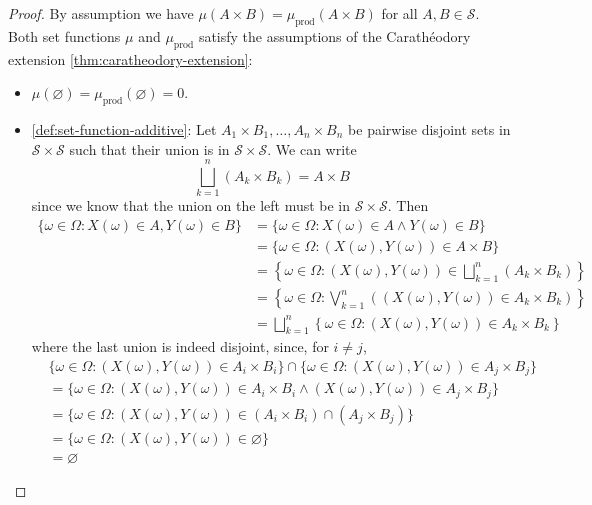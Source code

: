 \begin{proof}
By assumption we have $\mu(A \times B) = \mu_{\text{prod}}(A \times B)$ for all $A, B \in \mathcal{S}$.
Both set functions $\mu$ and $\mu_{\text{prod}}$ satisfy the assumptions of the Carathéodory extension \autoref{thm:caratheodory-extension}:
\begin{itemize}
  \item 
  $\mu(\varnothing)=\mu_{\text{prod}}(\varnothing)=0$. \cmark %
  \item 
  \ref{def:set-function-additive}:
  Let $A_1 \times B_1, \ldots, A_n \times B_n$ be pairwise disjoint sets in $\mathcal{S} \times \mathcal{S}$ such that their union is in $\mathcal{S} \times \mathcal{S}$.
  We can write
  \[
    \bigsqcup_{k = 1}^n (A_k \times B_k)
    = 
    A \times B 
  \]
  since we know that the union on the left must be in $\mathcal{S} \times \mathcal{S}$.
  Then
\begingroup
\allowdisplaybreaks
\begin{align*}
\{\omega \in \Omega : X(\omega) \in A, Y(\omega) \in B\} 
&=
\{\omega \in \Omega : X(\omega) \in A \wedge Y(\omega) \in B\} \\
&=
\{\omega \in \Omega : (X(\omega), Y(\omega)) \in A \times B\}  \\
&=
\left\{\omega \in \Omega : (X(\omega), Y(\omega)) \in \bigsqcup_{k = 1}^n (A_k \times B_k)\right\}  \\
&=
\left\{\omega \in \Omega : \bigvee_{k = 1}^n \left((X(\omega), Y(\omega)) \in A_k \times B_k \right)\right\}   \\
&=
\bigsqcup_{k = 1}^n \left\{\omega \in \Omega : (X(\omega), Y(\omega)) \in A_k \times B_k\right\} 
\end{align*}
\endgroup
where the last union is indeed disjoint, since, for $i \neq j$,
\begingroup
\allowdisplaybreaks
\begin{align*}
& \{\omega \in \Omega : (X(\omega), Y(\omega)) \in A_i \times B_i\}
\cap
\{\omega \in \Omega : (X(\omega), Y(\omega)) \in A_j \times B_j\} \\
&=
\{\omega \in \Omega : (X(\omega), Y(\omega)) \in A_i \times B_i
\wedge
(X(\omega), Y(\omega)) \in A_j \times B_j\} \\
&=
\{\omega \in \Omega : (X(\omega), Y(\omega)) \in (A_i \times B_i) \cap (A_j \times B_j)\} \\
&=
\{\omega \in \Omega : (X(\omega), Y(\omega)) \in \varnothing\} \\
&=
\varnothing 
\end{align*}

\end{itemize}
\end{proof}
